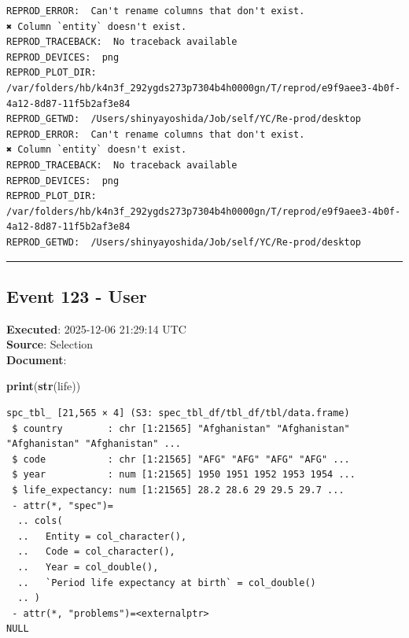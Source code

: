 \documentclass[
  11pt,
]{article}
\newenvironment{Shaded}{\begin{snugshade}}{\end{snugshade}}
\newcommand{\FunctionTok}[1]{\textcolor[rgb]{0.13,0.29,0.53}{\textbf{#1}}}
\newcommand{\NormalTok}[1]{#1}
\newenvironment{rpoutput}{\vspace{0.5em}\begin{snugshade}}{\end{snugshade}}
\begin{document}
\begin{rpoutput}

\begin{verbatim}
REPROD_ERROR:  Can't rename columns that don't exist.
✖ Column `entity` doesn't exist. 
REPROD_TRACEBACK:  No traceback available  
REPROD_DEVICES:  png 
REPROD_PLOT_DIR:  /var/folders/hb/k4n3f_292ygds273p7304b4h0000gn/T/reprod/e9f9aee3-4b0f-4a12-8d87-11f5b2af3e84 
REPROD_GETWD:  /Users/shinyayoshida/Job/self/YC/Re-prod/desktop 
REPROD_ERROR:  Can't rename columns that don't exist.
✖ Column `entity` doesn't exist. 
REPROD_TRACEBACK:  No traceback available  
REPROD_DEVICES:  png 
REPROD_PLOT_DIR:  /var/folders/hb/k4n3f_292ygds273p7304b4h0000gn/T/reprod/e9f9aee3-4b0f-4a12-8d87-11f5b2af3e84 
REPROD_GETWD:  /Users/shinyayoshida/Job/self/YC/Re-prod/desktop 
\end{verbatim}

\end{rpoutput}

\begin{center}\rule{0.5\linewidth}{0.5pt}\end{center}

\subsection{Event 123 - User}\label{event-123---user}

\textbf{Executed}: 2025-12-06 21:29:14 UTC\\
\textbf{Source}: Selection\\
\textbf{Document}:

\begin{Shaded}
\begin{Highlighting}[]
\FunctionTok{print}\NormalTok{(}\FunctionTok{str}\NormalTok{(life))}
\end{Highlighting}
\end{Shaded}

\begin{rpoutput}

\begin{verbatim}
spc_tbl_ [21,565 × 4] (S3: spec_tbl_df/tbl_df/tbl/data.frame)
 $ country        : chr [1:21565] "Afghanistan" "Afghanistan" "Afghanistan" "Afghanistan" ...
 $ code           : chr [1:21565] "AFG" "AFG" "AFG" "AFG" ...
 $ year           : num [1:21565] 1950 1951 1952 1953 1954 ...
 $ life_expectancy: num [1:21565] 28.2 28.6 29 29.5 29.7 ...
 - attr(*, "spec")=
  .. cols(
  ..   Entity = col_character(),
  ..   Code = col_character(),
  ..   Year = col_double(),
  ..   `Period life expectancy at birth` = col_double()
  .. )
 - attr(*, "problems")=<externalptr> 
NULL
\end{verbatim}

\end{rpoutput}
\end{document}
